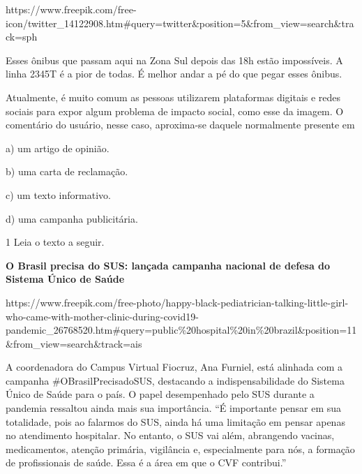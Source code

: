 {https://www.freepik.com/free-icon/twitter\_14122908.htm\#query=twitter\&position=5\&from\_view=search\&track=sph

Esses ônibus que passam aqui na Zona Sul depois das 18h estão
impossíveis. A linha 2345T é a pior de todas. É melhor andar a pé do que
pegar esses ônibus.

Atualmente, é muito comum as pessoas utilizarem plataformas digitais e
redes sociais para expor algum problema de impacto social, como esse da
imagem. O comentário do usuário, nesse caso, aproxima-se daquele
normalmente presente em

a) um artigo de opinião.

b) uma carta de reclamação.

c) um texto informativo.

d) uma campanha publicitária.



\num{1} Leia o texto a seguir.

\textbf{O Brasil precisa do SUS: lançada campanha nacional de defesa do
Sistema Único de Saúde}

https://www.freepik.com/free-photo/happy-black-pediatrician-talking-little-girl-who-came-with-mother-clinic-during-covid19-pandemic\_26768520.htm\#query=public\%20hospital\%20in\%20brazil\&position=11\&from\_view=search\&track=ais

A coordenadora do Campus Virtual Fiocruz, Ana Furniel, está alinhada com
a campanha \#OBrasilPrecisadoSUS, destacando a indispensabilidade do
Sistema Único de Saúde para o país. O papel desempenhado pelo SUS
durante a pandemia ressaltou ainda mais sua importância. ``É importante
pensar em sua totalidade, pois ao falarmos do SUS, ainda há uma
limitação em pensar apenas no atendimento hospitalar. No entanto, o SUS
vai além, abrangendo vacinas, medicamentos, atenção primária, vigilância
e, especialmente para nós, a formação de profissionais de saúde. Essa é
a área em que o CVF contribui.''

}
